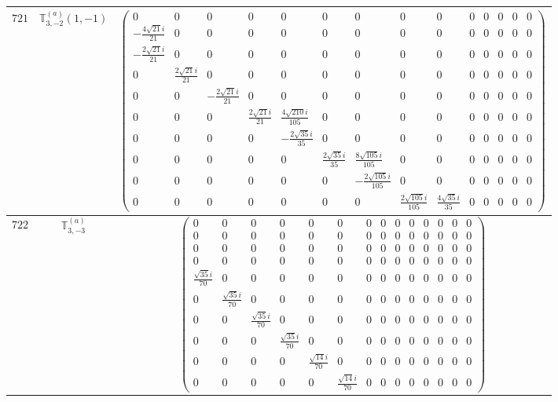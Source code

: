 \documentclass[fleqn,8pt,landscape]{jsarticle}
\begin{document}
\begin{center}
\begin{longtable}{ccc}
$ 721 $ & $ \mathbb{T}_{3,-2}^{(a)}(1,-1) $ & $ \begin{pmatrix} 0 & 0 & 0 & 0 & 0 & 0 & 0 & 0 & 0 & 0 & 0 & 0 & 0 & 0 \\ - \frac{4 \sqrt{21} i}{21} & 0 & 0 & 0 & 0 & 0 & 0 & 0 & 0 & 0 & 0 & 0 & 0 & 0 \\ - \frac{2 \sqrt{21} i}{21} & 0 & 0 & 0 & 0 & 0 & 0 & 0 & 0 & 0 & 0 & 0 & 0 & 0 \\ 0 & \frac{2 \sqrt{21} i}{21} & 0 & 0 & 0 & 0 & 0 & 0 & 0 & 0 & 0 & 0 & 0 & 0 \\ 0 & 0 & - \frac{2 \sqrt{21} i}{21} & 0 & 0 & 0 & 0 & 0 & 0 & 0 & 0 & 0 & 0 & 0 \\ 0 & 0 & 0 & \frac{2 \sqrt{21} i}{21} & \frac{4 \sqrt{210} i}{105} & 0 & 0 & 0 & 0 & 0 & 0 & 0 & 0 & 0 \\ 0 & 0 & 0 & 0 & - \frac{2 \sqrt{35} i}{35} & 0 & 0 & 0 & 0 & 0 & 0 & 0 & 0 & 0 \\ 0 & 0 & 0 & 0 & 0 & \frac{2 \sqrt{35} i}{35} & \frac{8 \sqrt{105} i}{105} & 0 & 0 & 0 & 0 & 0 & 0 & 0 \\ 0 & 0 & 0 & 0 & 0 & 0 & - \frac{2 \sqrt{105} i}{105} & 0 & 0 & 0 & 0 & 0 & 0 & 0 \\ 0 & 0 & 0 & 0 & 0 & 0 & 0 & \frac{2 \sqrt{105} i}{105} & \frac{4 \sqrt{35} i}{35} & 0 & 0 & 0 & 0 & 0 \end{pmatrix} $ \\ \hline
$ 722 $ & $ \mathbb{T}_{3,-3}^{(a)} $ & $ \begin{pmatrix} 0 & 0 & 0 & 0 & 0 & 0 & 0 & 0 & 0 & 0 & 0 & 0 & 0 & 0 \\ 0 & 0 & 0 & 0 & 0 & 0 & 0 & 0 & 0 & 0 & 0 & 0 & 0 & 0 \\ 0 & 0 & 0 & 0 & 0 & 0 & 0 & 0 & 0 & 0 & 0 & 0 & 0 & 0 \\ 0 & 0 & 0 & 0 & 0 & 0 & 0 & 0 & 0 & 0 & 0 & 0 & 0 & 0 \\ \frac{\sqrt{35} i}{70} & 0 & 0 & 0 & 0 & 0 & 0 & 0 & 0 & 0 & 0 & 0 & 0 & 0 \\ 0 & \frac{\sqrt{35} i}{70} & 0 & 0 & 0 & 0 & 0 & 0 & 0 & 0 & 0 & 0 & 0 & 0 \\ 0 & 0 & \frac{\sqrt{35} i}{70} & 0 & 0 & 0 & 0 & 0 & 0 & 0 & 0 & 0 & 0 & 0 \\ 0 & 0 & 0 & \frac{\sqrt{35} i}{70} & 0 & 0 & 0 & 0 & 0 & 0 & 0 & 0 & 0 & 0 \\ 0 & 0 & 0 & 0 & \frac{\sqrt{14} i}{70} & 0 & 0 & 0 & 0 & 0 & 0 & 0 & 0 & 0 \\ 0 & 0 & 0 & 0 & 0 & \frac{\sqrt{14} i}{70} & 0 & 0 & 0 & 0 & 0 & 0 & 0 & 0 \end{pmatrix} $ \\ \hline

\end{longtable}
\end{center}
\end{document}
